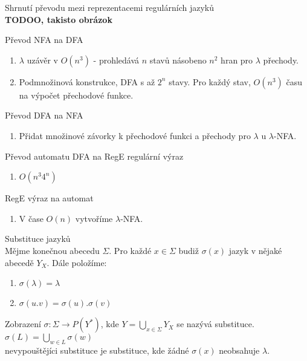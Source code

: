\documentclass[../main.tex]{subfiles}
\begin{document}
\begin{remark}
    Shrnutí převodu mezi reprezentacemi regulárních jazyků\\

    \textbf{TODOO, takisto obrázok}

    Převod NFA na DFA
    \begin{enumerate}
        \item $\lambda$ uzávěr v $O(n^3)$ - prohledává $n$ stavů násobeno $n^2$ hran pro $\lambda$ přechody.
        \item Podmnožinová konstrukce, DFA s až $2^n$ stavy. Pro každý stav, $O(n^3)$ času na výpočet přechodové funkce.
    \end{enumerate}

    Převod DFA na NFA
    \begin{enumerate}
        \item Přidat množinové závorky k přechodové funkci a přechody pro $\lambda$ u $\lambda$-NFA.
    \end{enumerate}

    Převod automatu DFA na RegE regulární výraz
    \begin{enumerate}
        \item $O(n^3 4^n)$
    \end{enumerate}
    
    RegE výraz na automat
    \begin{enumerate}
        \item V čase $O(n)$ vytvoříme $\lambda$-NFA.
    \end{enumerate}
\end{remark}

\begin{definition}
    Substituce jazyků\\

    Mějme konečnou abecedu $\Sigma$. Pro každé $x \in \Sigma$ budiž $\sigma(x)$ jazyk v nějaké abecedě $Y_X$. Dále položíme:
    \begin{enumerate}
        \item $\sigma(\lambda) = {\lambda}$
        \item $\sigma(u.v) = \sigma(u).\sigma(v)$ 
    \end{enumerate}

    Zobrazení $\sigma : \Sigma \rightarrow P(Y^*)$, kde $Y = \bigcup_{x\in \Sigma} Y_X$ se nazývá substituce.\\
    $\sigma(L) = \bigcup_{w\in L} \sigma(w)$\\
    nevypouštějíci substituce je substituce, kde žádné $\sigma(x)$ neobsahuje $\lambda$.
\end{definition}
\end{document}
